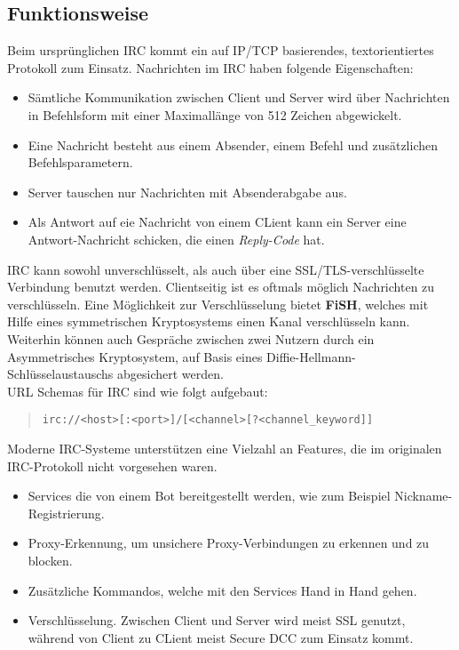 \subsection{Funktionsweise}
Beim ursprünglichen IRC kommt ein auf IP/TCP basierendes, textorientiertes Protokoll zum Einsatz.
Nachrichten im IRC haben folgende Eigenschaften:
\begin{itemize}
\item Sämtliche Kommunikation zwischen Client und Server wird über Nachrichten in Befehlsform mit einer Maximallänge von 512 Zeichen abgewickelt.
\item Eine Nachricht besteht aus einem Absender, einem Befehl und zusätzlichen Befehlsparametern.
\item Server tauschen nur Nachrichten mit Absenderabgabe aus.
\item Als Antwort auf eie Nachricht von einem CLient kann ein Server eine Antwort-Nachricht schicken, die einen \textit{Reply-Code} hat. 
\end{itemize}
IRC kann sowohl unverschlüsselt, als auch über eine SSL/TLS-verschlüsselte Verbindung benutzt werden. Clientseitig ist es oftmals möglich Nachrichten zu verschlüsseln. Eine Möglichkeit zur Verschlüsselung bietet \textbf{FiSH}, welches mit Hilfe eines symmetrischen Kryptosystems einen Kanal verschlüsseln kann. Weiterhin können auch Gespräche zwischen zwei Nutzern durch ein Asymmetrisches Kryptosystem, auf Basis eines Diffie-Hellmann-Schlüsselaustauschs abgesichert werden.
\\
URL Schemas für IRC sind wie folgt aufgebaut:
\begin{quote}
\verb|irc://<host>[:<port>]/[<channel>[?<channel_keyword]]|
\end{quote}
Moderne IRC-Systeme unterstützen eine Vielzahl an Features, die im originalen IRC-Protokoll nicht vorgesehen waren.
\begin{itemize}
\item Services die von einem Bot bereitgestellt werden, wie zum Beispiel Nickname-Registrierung.
\item Proxy-Erkennung, um unsichere Proxy-Verbindungen zu erkennen und zu blocken.
\item Zusätzliche Kommandos, welche mit den Services Hand in Hand gehen.
\item Verschlüsselung. Zwischen Client und Server wird meist SSL genutzt, während von Client zu CLient meist Secure DCC zum Einsatz kommt.
\end{itemize}

